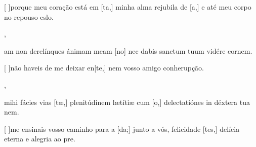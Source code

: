 {        {\item {}[ ]{por}que meu coração está em [ta,] minha alma rejubila de [a,] e até meu corpo no repouso eslo.},
    {\item {}am non derelínques ánimam meam [\-no] nec dabis sanctum tuum vidére cor\-nem.}%
        {\item {}[ ]{não} haveis de me deixar en[te,] nem vosso amigo conherupção.},
    {\item {} mihi fácies vias [tæ,] plenitúdinem lætítiæ cum [o,] delectatiónes in déxtera tua nem.}%
        {\item {}[ ]{me} ensinais vosso caminho para a [da;] junto a vós, felicidade [tes,] delícia eterna e alegria ao pre.}
}